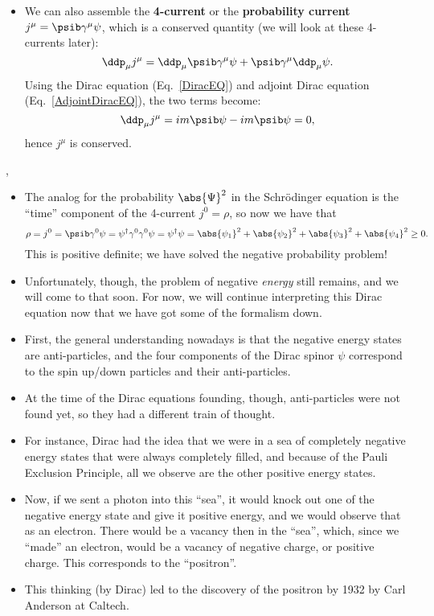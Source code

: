 \begin{itemize}
    \item We can also assemble the \textbf{4-current} or the \textbf{probability current} $j^{\mu} = \psib\gamma^{\mu}\psi$, which is a conserved quantity (we will look at these 4-currents later):
        \begin{equation*}
            \ddp_{\mu}j^{\mu} = \ddp_{\mu}\psib\gamma^{\mu}\psi + \psib\gamma^{\mu}\ddp_{\mu}\psi.
        \end{equation*}
        Using the Dirac equation (Eq.~\eqref{DiracEQ}) and adjoint Dirac equation (Eq.~\eqref{AdjointDiracEQ}), the two terms become:
        \begin{equation*}
            \ddp_{\mu}j^{\mu} = im\psib\psi - im\psib\psi = 0,
        \end{equation*}
        hence $j^{\mu}$ is conserved.
\end{itemize}

\sep

\begin{itemize}
    \item The analog for the probability $\abs{\Psi}^2$ in the Schr\"odinger equation is the ``time'' component of the 4-current $j^0 = \rho$, so now we have that
        \begin{equation*}
            \rho = j^0 = \psib\gamma^0\psi = \psi^{\dagger}\gamma^0\gamma^0\psi = \psi^{\dagger}\psi = \abs{\psi_1}^2 + \abs{\psi_2}^2 + \abs{\psi_3}^2 + \abs{\psi_4}^2 \geq 0.
        \end{equation*}
        This is positive definite; we have solved the negative probability problem!
    \item Unfortunately, though, the problem of negative \textit{energy} still remains, and we will come to that soon. For now, we will continue interpreting this Dirac equation now that we have got some of the formalism down.
    \item First, the general understanding nowadays is that the negative energy states are anti-particles, and the four components of the Dirac spinor $\psi$ correspond to the spin up/down particles and their anti-particles.
    \item At the time of the Dirac equations founding, though, anti-particles were not found yet, so they had a different train of thought.
    \item For instance, Dirac had the idea that we were in a sea of completely negative energy states that were always completely filled, and because of the Pauli Exclusion Principle, all we observe are the other positive energy states.
    \item Now, if we sent a photon into this ``sea'', it would knock out one of the negative energy state and give it positive energy, and we would observe that as an electron. There would be a vacancy then in the ``sea'', which, since we ``made'' an electron, would be a vacancy of negative charge, or positive charge. This corresponds to the ``positron''.
    \item This thinking (by Dirac) led to the discovery of the positron by 1932 by Carl Anderson at Caltech.
\end{itemize}


